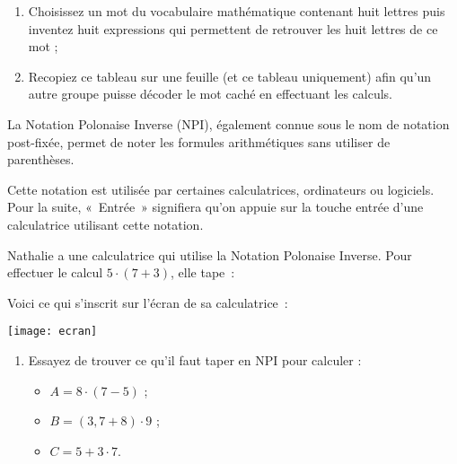 \begin{TP}
\begin{enumerate}

 \item Choisissez un mot du vocabulaire mathématique contenant huit lettres puis inventez huit expressions qui permettent de retrouver les huit lettres de ce mot ;
 \item Recopiez ce tableau sur une feuille (et ce tableau uniquement) afin qu'un autre groupe puisse décoder le mot caché en effectuant les calculs.
 
 \end{enumerate}

\end{TP}



\begin{TP}

La Notation Polonaise Inverse (NPI), également connue sous le nom de notation post-fixée, permet de noter les formules arithmétiques sans utiliser de parenthèses.

Cette notation est utilisée par certaines calculatrices, ordinateurs ou logiciels. Pour la suite, « Entrée » signifiera qu'on appuie sur la touche entrée d'une calculatrice utilisant cette notation.


Nathalie a une calculatrice qui utilise la Notation Polonaise Inverse. Pour effectuer le calcul $5 \cdot (7 + 3)$, elle tape : \\[-1em]
\begin{center} \boxed{\textcolor{C2}{7}} \quad \boxed{\textcolor{C2}{Entree}} \quad \boxed{\textcolor{H1}{3}} \quad \boxed{\textcolor{H1}{Entree}} \quad \boxed{\textcolor{BleuOuv}{+}} \quad \boxed{\textcolor{J1}{5}} \quad \boxed{\textcolor{J1}{Entree}} \quad \boxed{\times} \end{center}

\vspace{1em}

Voici ce qui s'inscrit sur l'écran de sa calculatrice :\\[1em]
\begin{center} \texttt{[image: ecran]} \end{center}

\begin{enumerate}
 \item Essayez de trouver ce qu'il faut taper en NPI pour calculer :
 \begin{itemize}
  \item $A = 8 \cdot (7 - 5)$ ;
  \item $B = (3,7 + 8) \cdot 9$ ;
  \item $C = 5 + 3 \cdot 7$.
  \end{itemize}
  

\end{enumerate}
\end{TP}
